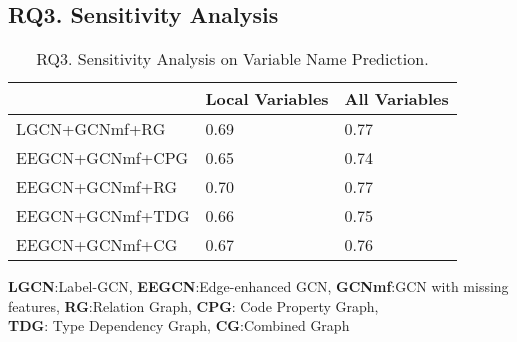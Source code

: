 \subsection{{\bf RQ3. Sensitivity Analysis}}
\label{empirical-rq3}





\begin{table}[t]
	\caption{RQ3. Sensitivity Analysis on Variable Name Prediction.}
	\begin{center}
		\small
		\renewcommand{\arraystretch}{1} 
		\begin{tabular}{p{2.5cm}<{\centering}|p{2cm}<{\centering}|p{2cm}<{\centering}}
			\hline
			                    & Local Variables & All Variables\\
			\hline
			LGCN+GCNmf+RG       & 0.69            & 0.77    \\
			EEGCN+GCNmf+CPG     & 0.65            & 0.74    \\
			EEGCN+GCNmf+RG      & 0.70            & 0.77    \\
			EEGCN+GCNmf+TDG     & 0.66            & 0.75    \\
			EEGCN+GCNmf+CG      & 0.67            & 0.76    \\
			\hline
		\end{tabular}
		\label{RQ3-result-1}
		{\bf LGCN}:Label-GCN, {\bf EEGCN}:Edge-enhanced GCN, {\bf GCNmf}:GCN with missing features, {\bf RG}:Relation Graph, {\bf CPG}: Code Property Graph, \\{\bf TDG}: Type Dependency Graph, {\bf CG}:Combined Graph
	\end{center}
\end{table}

